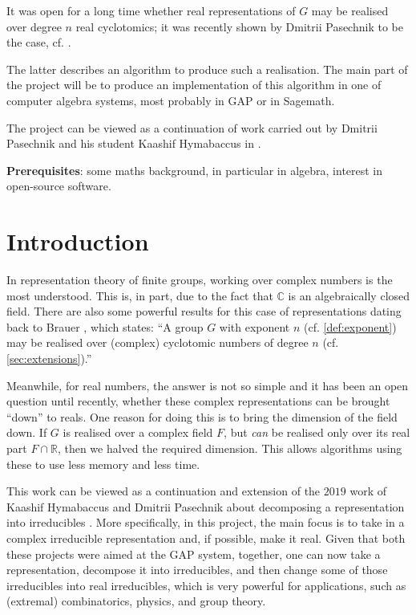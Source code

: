 \documentclass[11pt]{article}
\begin{document}
It was open for a long time whether real representations of $G$ may be realised
over degree $n$ real cyclotomics; it was recently shown by Dmitrii Pasechnik to
be the case, cf. \cite{Pas21}.

The latter describes an algorithm to produce such a realisation. The main part
of the project will be to produce an implementation of this algorithm in one of
computer algebra systems, most probably in GAP or in Sagemath.

The project can be viewed as a continuation of work carried out by Dmitrii
Pasechnik and his student Kaashif Hymabaccus in \cite{Hymabaccus2020}.

\textbf{Prerequisites}: some maths background, in particular in algebra,
interest in open-source software.

\newpage

\tableofcontents

\newpage

\section{Introduction}

In representation theory of finite groups, working over complex numbers is the
most understood. This is, in part, due to the fact that $\mathbb{C}$ is an
algebraically closed field. There are also some powerful results for this case of
representations dating back to Brauer \cite[(10.3)]{ISAACS}, which
states: ``A group $G$ with exponent $n$ (cf. \cref{def:exponent}) may be
realised over (complex) cyclotomic numbers of degree $n$
(cf. \cref{sec:extensions}).''

Meanwhile, for real numbers, the answer is not so simple and it has been an open
question until recently, whether these complex representations can be brought
``down'' to reals. One reason for doing this is to bring the dimension of the
field down. If $G$ is realised over a complex field $F$, but \textit{can} be
realised only over its real part $F \cap \mathbb{R}$, then we halved the required
dimension. This allows algorithms using these to use less memory and less time.

This work can be viewed as a continuation and extension of the $2019$ work of
Kaashif Hymabaccus and Dmitrii Pasechnik about decomposing a representation into
irreducibles \cite{Hymabaccus2020}. More specifically, in this project, the main
focus is to take in a complex irreducible representation and, if possible,
make it real. Given that both these projects were aimed at the GAP system,
together, one can now take a representation, decompose it into irreducibles, and
then change some of those irreducibles into real irreducibles, which is very
powerful for applications, such as (extremal) combinatorics, physics, and
group theory.
\end{document}
